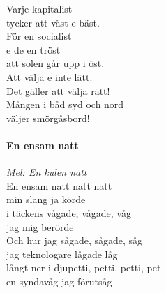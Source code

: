 \documentclass[12pt]{article}
\begin{document}
\begin{minipage}{.45\textwidth}
	Varje kapitalist\\
	tycker att väst e bäst.\\
	För en socialist\\
	e de en tröst\\
	att solen går upp i öst.\\
	
	\noindent
	Att välja e inte lätt.\\
	Det gäller att välja rätt!\\
	Mången i båd syd och nord\\
	väljer smörgåsbord!\\
	
	\noindent
	\begin{minipage}{1\textwidth}
		\paragraph*{En ensam natt\\}
		\vspace{3px}
		\textit{Mel: En kulen natt}\\
		
		\noindent
		En ensam natt natt natt\\
		min slang ja körde\\
		i täckens vågade, vågade, våg\\
		jag mig berörde\\
		Och hur jag sågade, sågade, såg\\
		jag teknologare lågade låg\\
		långt ner i djupetti, petti, petti, pet\\
		en syndavåg jag förutsåg\\		
	\end{minipage}\\
	\vspace{3.6cm}

\end{minipage}
\end{document}
